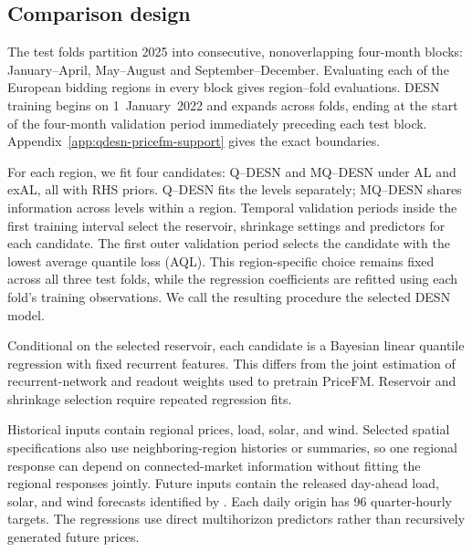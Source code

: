 \subsection{Comparison design}

The \PricefmFullFolds{} test folds partition 2025 into consecutive,
nonoverlapping four-month blocks: January--April, May--August and
September--December. Evaluating each of the \PricefmFullRegions{} European
bidding regions in every block gives \PricefmFullRegionFolds{} region--fold
evaluations. DESN training begins on 1~January~2022 and expands across folds,
ending at the start of the four-month validation period immediately preceding
each test block. Appendix~\ref{app:qdesn-pricefm-support} gives the exact
boundaries.

For each region, we fit four candidates: Q--DESN and MQ--DESN under AL and
exAL, all with RHS priors. Q--DESN fits the levels separately; MQ--DESN shares
information across levels within a region. Temporal validation periods inside
the first training interval select the reservoir, shrinkage settings and
predictors for each candidate. The first outer validation period selects the
candidate with the lowest average quantile loss (AQL). This region-specific choice remains fixed
across all three test folds, while the regression coefficients are refitted
using each fold's training observations. We call the resulting procedure the
selected DESN model.

Conditional on the selected reservoir, each candidate is a Bayesian linear
quantile regression with fixed recurrent features. This differs from the
joint estimation of recurrent-network and readout weights used to pretrain
PriceFM. Reservoir and
shrinkage selection require repeated regression fits.

Historical inputs contain regional prices, load, solar, and wind. Selected
spatial specifications also use neighboring-region histories or summaries,
so one regional response can depend on connected-market information without
fitting the regional responses jointly. Future inputs contain the released
day-ahead load, solar, and wind forecasts identified by
\citet{qdesn-YuEtAl2026PriceFM}. Each daily origin has 96 quarter-hourly
targets.
The regressions use direct multihorizon predictors rather than recursively
generated future prices.

